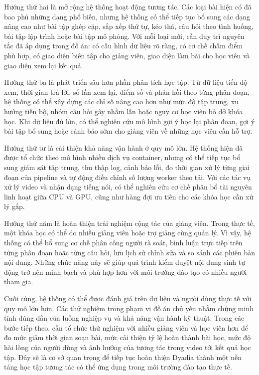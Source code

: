 \documentclass[../DoAn.tex]{subfiles}
\begin{document}
Hướng thứ hai là mở rộng hệ thống hoạt động tương tác. Các loại bài hiện có đã bao phủ những dạng phổ biến, nhưng hệ thống có thể tiếp tục bổ sung các dạng nâng cao như bài tập ghép cặp, sắp xếp thứ tự, kéo thả, câu hỏi theo tình huống, bài tập lập trình hoặc bài tập mô phỏng. Với mỗi loại mới, cần duy trì nguyên tắc đã áp dụng trong đồ án: có cấu hình dữ liệu rõ ràng, có cơ chế chấm điểm phù hợp, có giao diện biên tập cho giảng viên, giao diện làm bài cho học viên và giao diện xem lại kết quả.

Hướng thứ ba là phát triển sâu hơn phần phân tích học tập. Từ dữ liệu tiến độ xem, thời gian trả lời, số lần xem lại, điểm số và phản hồi theo từng phân đoạn, hệ thống có thể xây dựng các chỉ số nâng cao hơn như mức độ tập trung, xu hướng tiến bộ, nhóm câu hỏi gây nhầm lẫn hoặc nguy cơ học viên bỏ dở khóa học. Khi dữ liệu đủ lớn, có thể nghiên cứu mô hình gợi ý học lại phân đoạn, gợi ý bài tập bổ sung hoặc cảnh báo sớm cho giảng viên về những học viên cần hỗ trợ.

Hướng thứ tư là cải thiện khả năng vận hành ở quy mô lớn. Hệ thống hiện đã được tổ chức theo mô hình nhiều dịch vụ container, nhưng có thể tiếp tục bổ sung giám sát tập trung, thu thập log, cảnh báo lỗi, đo thời gian xử lý từng giai đoạn của pipeline và tự động điều chỉnh số lượng worker theo tải. Với các tác vụ xử lý video và nhận dạng tiếng nói, có thể nghiên cứu cơ chế phân bổ tài nguyên linh hoạt giữa CPU và GPU, cũng như hàng đợi ưu tiên cho các khóa học cần xử lý gấp.

Hướng thứ năm là hoàn thiện trải nghiệm cộng tác của giảng viên. Trong thực tế, một khóa học có thể do nhiều giảng viên hoặc trợ giảng cùng quản lý. Vì vậy, hệ thống có thể bổ sung cơ chế phân công người rà soát, bình luận trực tiếp trên từng phân đoạn hoặc từng câu hỏi, lưu lịch sử chỉnh sửa và so sánh các phiên bản nội dung. Những chức năng này sẽ giúp quá trình kiểm duyệt nội dung sinh tự động trở nên minh bạch và phù hợp hơn với môi trường đào tạo có nhiều người tham gia.

Cuối cùng, hệ thống có thể được đánh giá trên dữ liệu và người dùng thực tế với quy mô lớn hơn. Các thử nghiệm trong phạm vi đồ án chủ yếu nhằm chứng minh tính đúng đắn của luồng nghiệp vụ và khả năng vận hành kỹ thuật. Trong các bước tiếp theo, cần tổ chức thử nghiệm với nhiều giảng viên và học viên hơn để đo mức giảm thời gian soạn bài, mức cải thiện tỷ lệ hoàn thành bài học, mức độ hài lòng của người dùng và ảnh hưởng của tương tác trong video tới kết quả học tập. Đây sẽ là cơ sở quan trọng để tiếp tục hoàn thiện Dyadia thành một nền tảng học tập tương tác có thể ứng dụng trong môi trường đào tạo thực tế.
\end{document}
